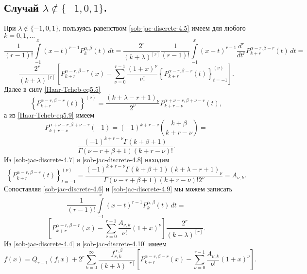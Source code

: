 \subsection{Случай $\lambda \notin \{-1,0,1\}$.}

При $\lambda \notin \{-1,0,1\}$, пользуясь равенством \eqref{sob-jac-discrete-4.5} имеем
для любого $k=0,1,\ldots$
$$
\frac{1}{(r-1)!}\int\limits^x_{-1}(x-t)^{r-1}P_k^{\alpha,\beta}(t)\,dt=
\frac{2^r}{(k+\lambda)^{[r]}}\frac{1}{(r-1)!}\int\limits^x_{-1}(x-t)^{r-1}
\frac{d^r}{dt^r}P_{k+r}^{\alpha-r,\beta-r}(t)\,dt=
$$
\begin{equation}\label{sob-jac-discrete-4.6}
\frac{2^r}{(k+\lambda)^{[r]}}\left[P_{k+r}^{\alpha-r,\beta-r}(x)-\sum^{r-1}_{\nu=0}
\frac{(1+x)^\nu}{\nu!}\left\{P_{k+r}^{\alpha-r,\beta-r}(t)
\right\}_{t=-1}^{(\nu)}\right].
\end{equation}
 Далее в силу \eqref{Haar-Tcheb-eq5.5}
 \begin{equation}\label{sob-jac-discrete-4.7}
\left\{P_{k+r}^{\alpha-r,\beta-r}(t)\right\}^{(\nu)}=\frac{(k+\lambda-r+1)_\nu}{2^\nu}P_{k+r-\nu}^{\alpha+\nu-r,\beta+\nu-r}(t),
\end{equation}
а из \eqref{Haar-Tcheb-eq5.9} имеем
$$P_{k+r-\nu}^{\alpha+\nu-r,\beta+\nu-r}(-1)=(-1)^{k+r-\nu}{k+\beta\choose k+r-\nu}=$$
\begin{equation}\label{sob-jac-discrete-4.8}
\frac{(-1)^{k+r-\nu}\Gamma(k+\beta+1)}{\Gamma(\nu-r+\beta+1)(k+r-\nu)!}.
\end{equation}
Из \eqref{sob-jac-discrete-4.7}  и \eqref{sob-jac-discrete-4.8} находим
\begin{equation}\label{sob-jac-discrete-4.9}
\left\{P_{k+r}^{\alpha-r,\beta-r}(t)\right\}_{t=-1}^{(\nu)}=
\frac{(-1)^{k+r-\nu}\Gamma(k+\beta+1)(k+\lambda-r+1)_{\nu}}{\Gamma(\nu-r+\beta+1)(k+r-\nu)!2^\nu}=A_{\nu,k}.
\end{equation}
Сопоставляя \eqref{sob-jac-discrete-4.6} и \eqref{sob-jac-discrete-4.9} мы можем записать
$$\frac{1}{(r-1)!}\int\limits^x_{-1}(x-t)^{r-1}P_k^{\alpha,\beta}(t)\,dt=$$
\begin{equation}\label{sob-jac-discrete-4.10}
\left[P_{k+r}^{\alpha-r,\beta-r}(x)-\sum^{r-1}_{\nu=0}\frac{A_{\nu,k}}{\nu!}(1+x)^{\nu}\right]\frac{2^r}{(k+\lambda)^{[r]}}.
\end{equation}
Из \eqref{sob-jac-discrete-4.4} и \eqref{sob-jac-discrete-4.10}  имеем
\begin{equation}\label{sob-jac-discrete-4.11}
f(x)=Q_{r-1}(f,x)+
2^r\sum_{k=0}^\infty\frac{f^{\alpha,\beta}_{r,k}}{(k+\lambda)^{[r]}}\left[P_{k+r}^{\alpha-r,\beta-r}(x)-
\sum^{r-1}_{\nu=0}\frac{A_{\nu,k}}{\nu!}(1+x)^{\nu}\right].
\end{equation}
